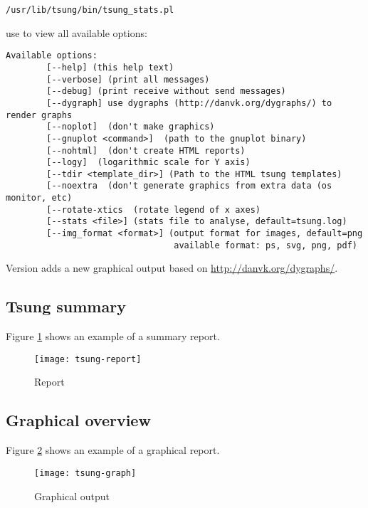 \documentclass{TSUNG-en}
\begin{document}
\begin{Verbatim}
/usr/lib/tsung/bin/tsung_stats.pl
\end{Verbatim}


use  to view all available options:

\begin{Verbatim}
Available options:
        [--help] (this help text)
        [--verbose] (print all messages)
        [--debug] (print receive without send messages)
        [--dygraph] use dygraphs (http://danvk.org/dygraphs/) to render graphs
        [--noplot]  (don't make graphics)
        [--gnuplot <command>]  (path to the gnuplot binary)
        [--nohtml]  (don't create HTML reports)
        [--logy]  (logarithmic scale for Y axis)
        [--tdir <template_dir>] (Path to the HTML tsung templates)
        [--noextra  (don't generate graphics from extra data (os monitor, etc)
        [--rotate-xtics  (rotate legend of x axes)
        [--stats <file>] (stats file to analyse, default=tsung.log)
        [--img_format <format>] (output format for images, default=png
                                 available format: ps, svg, png, pdf)
\end{Verbatim}

Version  adds a new graphical output based on
\url{http://danvk.org/dygraphs/}.

\subsection{Tsung summary}
Figure \ref{fig:report} shows an example of a summary report.
\begin{figure}[htb]
  \begin{center}
    \texttt{[image: tsung-report]}
    \end{center}
      \caption{Report}
    \label{fig:report}
\end{figure}

\subsection{Graphical overview}

Figure \ref{fig:graph} shows an example of a graphical report.

\begin{figure}[htb]
  \begin{center}
    \texttt{[image: tsung-graph]}
    \end{center}
      \caption{Graphical output}
    \label{fig:graph}
\end{figure}
\end{document}
